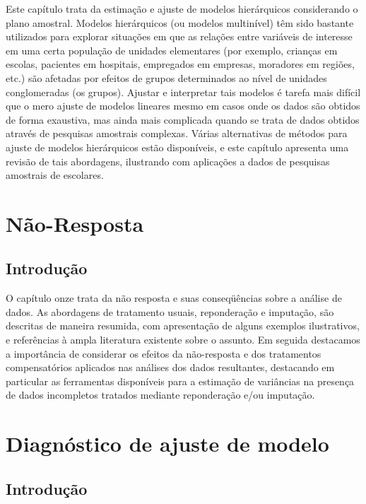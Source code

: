 \documentclass[]{book}
\numberwithin{example}{chapter}
\numberwithin{remark}{chapter}
\numberwithin{definition}{chapter}
\begin{document}
Este capítulo trata da estimação e ajuste de modelos hierárquicos
considerando o plano amostral. Modelos hierárquicos (ou modelos
multinível) têm sido bastante utilizados para explorar situações em que
as relações entre variáveis de interesse em uma certa população de
unidades elementares (por exemplo, crianças em escolas, pacientes em
hospitais, empregados em empresas, moradores em regiões, etc.) são
afetadas por efeitos de grupos determinados ao nível de unidades
conglomeradas (os grupos). Ajustar e interpretar tais modelos é tarefa
mais difícil que o mero ajuste de modelos lineares mesmo em casos onde
os dados são obtidos de forma exaustiva, mas ainda mais complicada
quando se trata de dados obtidos através de pesquisas amostrais
complexas. Várias alternativas de métodos para ajuste de modelos
hierárquicos estão disponíveis, e este capítulo apresenta uma revisão de
tais abordagens, ilustrando com aplicações a dados de pesquisas
amostrais de escolares.

\chapter{Não-Resposta}\label{nao-resposta}

\section{Introdução}\label{introducao-5}

O capítulo onze trata da não resposta e suas conseqüências sobre a
análise de dados. As abordagens de tratamento usuais, reponderação e
imputação, são descritas de maneira resumida, com apresentação de alguns
exemplos ilustrativos, e referências à ampla literatura existente sobre
o assunto. Em seguida destacamos a importância de considerar os efeitos
da não-resposta e dos tratamentos compensatórios aplicados nas análises
dos dados resultantes, destacando em particular as ferramentas
disponíveis para a estimação de variâncias na presença de dados
incompletos tratados mediante reponderação e/ou imputação.

\chapter{Diagnóstico de ajuste de
modelo}\label{diagnostico-de-ajuste-de-modelo}

\section{Introdução}\label{introducao-6}
\end{document}
